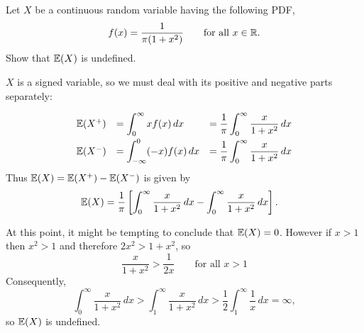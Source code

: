 \begin{example}%
Let $X$ be a continuous random variable having the following PDF,
\[
f(x) = \frac{1}{\pi(1+x^2)}\qquad\text{for all $x\in\mathbb{R}$.}
\]
Show that $\mathbb{E}(X)$ is undefined.
\begin{solution}
$X$ is a signed variable, so we must deal with its positive and negative parts separately:

\[\begin{array}{lll}
\mathbb{E}(X^{+}) 
	& = \displaystyle\int_0^\infty xf(x)\,dx 
	& = \displaystyle\frac{1}{\pi}\int_0^\infty \frac{x}{1+x^2}\,dx  \\[2ex]
\mathbb{E}(X^{-})	
	& = \displaystyle\int_{-\infty}^0 (-x)f(x)\,dx
	& = \displaystyle\frac{1}{\pi}\int_0^{\infty} \frac{x}{1+x^2}\,dx
\end{array}\]
Thus $\mathbb{E}(X) = \mathbb{E}(X^{+}) - \mathbb{E}(X^{-})$ is given by
\begin{align*}
\mathbb{E}(X)
	& = \frac{1}{\pi}\left[\int_0^{\infty} \frac{x}{1+x^2}\,dx - \int_0^{\infty} \frac{x}{1+x^2}\,dx\right].
\end{align*}

At this point, it might be tempting to conclude that $\mathbb{E}(X)=0$. However if $x>1$ then $x^2 > 1$ and therefore $2x^2 > 1+x^2$, so
\[
\frac{x}{1+x^2} > \frac{1}{2x} \qquad\text{for all } x > 1
\]
Consequently,
\[
\int_{0}^{\infty}\frac{x}{1+x^2}\,dx
	> \int_{1}^{\infty}\frac{x}{1+x^2}\,dx
	> \frac{1}{2}\int_{1}^{\infty}\frac{1}{x}\,dx
	= \infty,
\]
so $\mathbb{E}(X)$ is undefined.
\end{solution}
\end{example}

